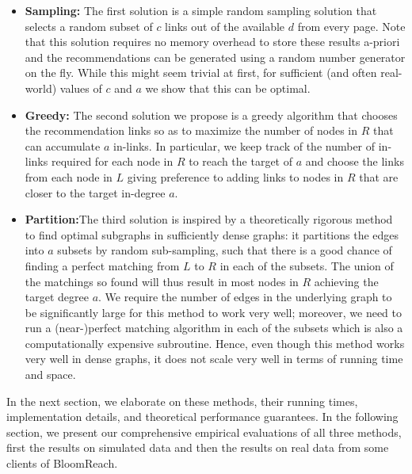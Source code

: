 \begin{itemize}
\item {\bf Sampling:} The first solution is a simple random sampling solution that selects a random subset of $c$ links out of the available $d$ from every page. Note that this solution requires no memory overhead to store these results a-priori and the recommendations can be generated using a random number generator on the fly. While this might seem trivial at first, for sufficient (and often real-world) values of $c$ and $a$ we show that this can be optimal.
\item {\bf Greedy:} The second solution we propose is a greedy algorithm that chooses the recommendation links so as to maximize the number of nodes in $R$ that can accumulate $a$ in-links. In particular, we keep track of the number of in-links required for each node in $R$ to reach the target of $a$ and choose the links from each node in $L$ giving preference to adding links to nodes in $R$ that are closer to the target in-degree $a$.
\item {\bf Partition:}The third solution is inspired by a theoretically rigorous method to find optimal subgraphs in sufficiently dense graphs: it partitions the edges into $a$ subsets by random sub-sampling, such that there is a good chance of finding a perfect matching from $L$ to $R$ in each of the subsets. The union of the matchings so found will thus result in most nodes in $R$ achieving the target degree $a$. We require the number of edges in the underlying graph to be significantly large for this method to work very well; moreover, we need to run a (near-)perfect matching algorithm in each of the subsets which is also a computationally expensive subroutine. Hence, even though this method works very well in dense graphs, it does not scale very well in terms of running time and space.
\end{itemize}

In the next section, we elaborate on these methods, their running times, implementation details, and theoretical performance guarantees. In the following section, we present our comprehensive empirical evaluations of all three methods, first the results on simulated data and then the results on real data from some clients of BloomReach.
 